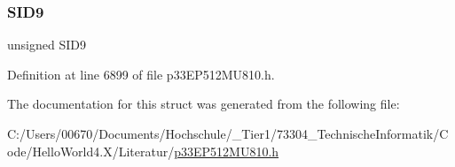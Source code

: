 \subsubsection{\texorpdfstring{S\+I\+D9}{SID9}}
{\footnotesize\ttfamily unsigned S\+I\+D9}



Definition at line 6899 of file p33\+E\+P512\+M\+U810.\+h.



The documentation for this struct was generated from the following file\+:\begin{DoxyCompactItemize}
\item 
C\+:/\+Users/00670/\+Documents/\+Hochschule/\+\_\+\+Tier1/73304\+\_\+\+Technische\+Informatik/\+Code/\+Hello\+World4.\+X/\+Literatur/\hyperlink{p33_e_p512_m_u810_8h}{p33\+E\+P512\+M\+U810.\+h}\end{DoxyCompactItemize}
